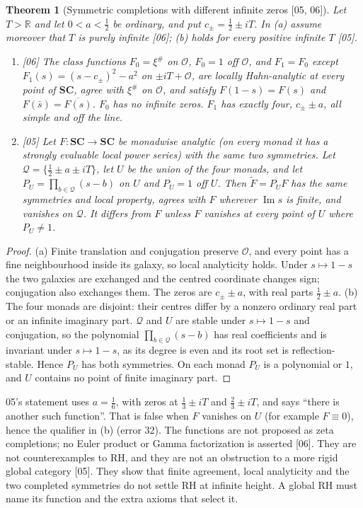 \documentclass[11pt,a4paper]{article}
\numberwithin{equation}{section}
\newtheorem{theorem}{Theorem}[section]
\theoremstyle{definition}
\theoremstyle{remark}
\newcommand{\SC}{\mathbf{SC}}
\newcommand{\R}{\mathbb R}
\newcommand{\OO}{\mathcal O}
\renewcommand{\Im}{\operatorname{Im}}
\newcommand{\xip}{\xi^{\#}}
\newcommand{\src}[1]{\textup{[#1]}}
\begin{document}
\begin{theorem}[Symmetric completions with different infinite zeros \src{05, 06}]\label{gz:thm:weak}
Let $T>\R$ and let $0<a<\tfrac12$ be ordinary, and put
$c_\pm=\tfrac12\pm iT$. In (a) assume moreover that $T$ is purely infinite
\src{06}; (b) holds for every positive infinite $T$ \src{05}.
\begin{enumerate}[label=(\alph*)]
\item \src{06} The class functions $F_0=\xip$ on $\OO$, $F_0=1$ off $\OO$, and
 $F_1=F_0$ except $F_1(s)=(s-c_\pm)^2-a^2$ on $\pm iT+\OO$, are locally
 Hahn-analytic at every point of $\SC$, agree with $\xip$ on $\OO$, and satisfy
 $F(1-s)=F(s)$ and $F(\bar s)=\overline{F(s)}$. $F_0$ has no infinite zeros.
 $F_1$ has exactly four, $c_\pm\pm a$, all simple and off the line.
\item \src{05} Let $F:\SC\to\SC$ be monadwise analytic (on every monad it has
 a strongly evaluable local power series) with the same two symmetries. Let
 $\mathcal Q=\{\tfrac12\pm a\pm iT\}$, let $U$ be the union of the four
 monads, and let $P_U=\prod_{b\in\mathcal Q}(s-b)$ on $U$ and $P_U=1$ off $U$. Then
 $\widetilde F=P_UF$ has the same symmetries and local property, agrees with
 $F$ wherever $\Im s$ is finite, and vanishes on $\mathcal Q$. It differs
 from $F$ unless $F$ vanishes at every point of $U$ where $P_U\ne1$.
\end{enumerate}
\end{theorem}
\begin{proof}
(a) Finite translation and conjugation preserve $\OO$, and every point has a
fine neighbourhood inside its galaxy, so local analyticity holds. Under
$s\mapsto1-s$ the two galaxies are exchanged and the centred coordinate
changes sign; conjugation also exchanges them. The zeros are $c_\pm\pm a$,
with real parts $\tfrac12\pm a$. (b) The four monads are disjoint: their
centres differ by a nonzero ordinary real part or an infinite imaginary part.
$\mathcal Q$ and $U$ are stable under $s\mapsto1-s$ and conjugation, so the
polynomial $\prod_{b\in\mathcal Q}(s-b)$ has real coefficients and is
invariant under $s\mapsto1-s$, as its degree is even and its root set is
reflection-stable. Hence $P_U$ has both symmetries. On each monad $P_U$ is
a polynomial or $1$, and $U$ contains no point of finite imaginary part.
\end{proof}
05's statement uses $a=\tfrac16$, with zeros at $\tfrac13\pm iT$ and
$\tfrac23\pm iT$, and says ``there is another such function''. That is false
when $F$ vanishes on $U$ (for example $F\equiv0$), hence the qualifier in
(b) (error 32). The functions are not proposed as zeta completions; no Euler
product or Gamma factorization is asserted \src{06}. They are not
counterexamples to RH, and they are not an obstruction to a more rigid global
category \src{05}. They show that finite agreement, local analyticity and
the two completed symmetries do not settle RH at infinite height. A global RH
must name its function and the extra axioms that select it.
\end{document}
